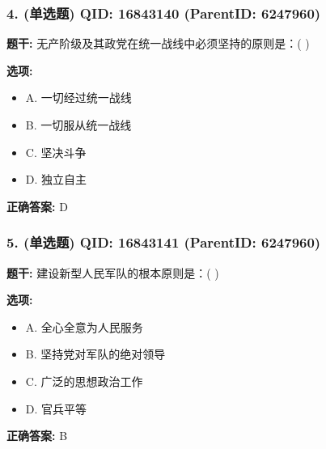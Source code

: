 \documentclass[12pt,UTF8]{ctexart}
\begin{document}
\vspace{0.3em}\hrulefill\vspace{0.7em}

\subsubsection*{4. (单选题) \small QID: 16843140 (ParentID: 6247960)}

\textbf{题干:}
无产阶级及其政党在统一战线中必须坚持的原则是：( )



\textbf{选项:}
\begin{itemize}[leftmargin=*]

  \item A. 一切经过统一战线

  \item B. 一切服从统一战线

  \item C. 坚决斗争

  \item D. 独立自主

\end{itemize}

\textbf{正确答案:}
D

\vspace{0.3em}\hrulefill\vspace{0.7em}

\subsubsection*{5. (单选题) \small QID: 16843141 (ParentID: 6247960)}

\textbf{题干:}
建设新型人民军队的根本原则是：( )



\textbf{选项:}
\begin{itemize}[leftmargin=*]

  \item A. 全心全意为人民服务

  \item B. 坚持党对军队的绝对领导

  \item C. 广泛的思想政治工作

  \item D. 官兵平等

\end{itemize}

\textbf{正确答案:}
B

\vspace{0.3em}\hrulefill\vspace{0.7em}
\end{document}
